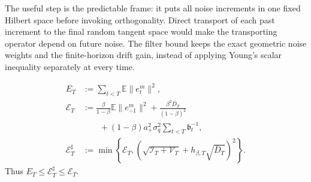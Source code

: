 The useful step is the predictable frame: it puts all noise increments in one fixed Hilbert space before invoking orthogonality. Direct transport of each past increment to the final random tangent space would make the transporting operator depend on future noise. The filter bound keeps the exact geometric noise weights and the finite-horizon drift gain, instead of applying Young's scalar inequality separately at every time.

\begin{definition}
\begin{align}
 E_T&:=\sum_{t<T}\mathbb E\|e_{t}^{m}\|^2,\\
 \mathscr E_T&:=\frac{\beta}{1-\beta}\mathbb E\|e_{-1}^{m}\|^2+
 \frac{\beta^2\overline D_T}{(1-\beta)^2}\\
 &\qquad +(1-\beta)a_+^2\sigma_q^2\sum_{t<T}\mathfrak b_t^{-1},\\
 \mathscr E_T^\sharp&:=\min\left\{\mathscr E_T,
 \left(\sqrt{\mathcal I_T+\mathcal V_T}+h_{\beta,T}\sqrt{\overline D_T}\right)^2\right\}.
\end{align}
Thus $E_T\le\mathscr E_T^\sharp\le\mathscr E_T$.
\end{definition}

